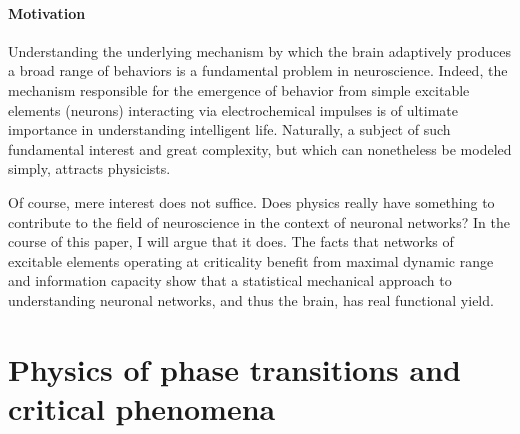 \documentclass[12pt]{article}
\begin{document}
\paragraph*{Motivation}

Understanding the underlying mechanism by which the brain adaptively produces a broad range of behaviors is a fundamental problem in neuroscience. Indeed, the mechanism responsible for the emergence of behavior from simple excitable elements (neurons) interacting via electrochemical impulses is of ultimate importance in understanding intelligent life. Naturally, a subject of such fundamental interest and great complexity, but which can nonetheless be modeled simply, attracts physicists. 

Of course, mere interest does not suffice. Does physics really have something to contribute to the field of neuroscience in the context of neuronal networks? In the course of this paper, I will argue that it does. The facts that networks of excitable elements operating at criticality benefit from maximal dynamic range \cite{Kinouchi2006b,Shew2009b} and information capacity\cite{Shew2011a} show that a statistical mechanical approach to understanding neuronal networks, and thus the brain, has real functional yield.

\section*{Physics of phase transitions and critical phenomena}
\end{document}
